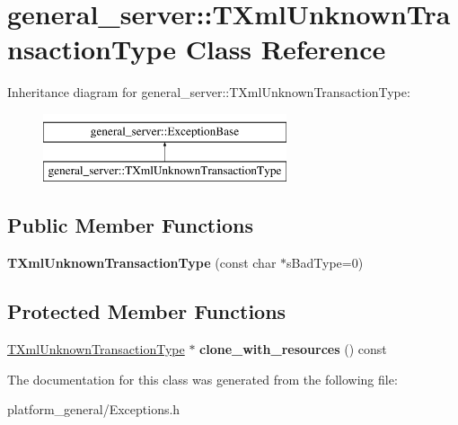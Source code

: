 \hypertarget{classgeneral__server_1_1TXmlUnknownTransactionType}{\section{general\-\_\-server\-:\-:\-T\-Xml\-Unknown\-Transaction\-Type \-Class \-Reference}
\label{classgeneral__server_1_1TXmlUnknownTransactionType}
}
\-Inheritance diagram for general\-\_\-server\-:\-:\-T\-Xml\-Unknown\-Transaction\-Type\-:\begin{figure}[H]
\begin{center}
\leavevmode
\includegraphics[height=2.000000cm]{classgeneral__server_1_1TXmlUnknownTransactionType}
\end{center}
\end{figure}
\subsection*{\-Public \-Member \-Functions}
\begin{DoxyCompactItemize}
\item 
\hypertarget{classgeneral__server_1_1TXmlUnknownTransactionType_aa725714e2ea10f4ae264928d775fbc92}{{\bfseries \-T\-Xml\-Unknown\-Transaction\-Type} (const char $\ast$s\-Bad\-Type=0)}\label{classgeneral__server_1_1TXmlUnknownTransactionType_aa725714e2ea10f4ae264928d775fbc92}

\end{DoxyCompactItemize}
\subsection*{\-Protected \-Member \-Functions}
\begin{DoxyCompactItemize}
\item 
\hypertarget{classgeneral__server_1_1TXmlUnknownTransactionType_ad0a379c672fdc70eaa5d060a7d58a48a}{\hyperlink{classgeneral__server_1_1TXmlUnknownTransactionType}{\-T\-Xml\-Unknown\-Transaction\-Type} $\ast$ {\bfseries clone\-\_\-with\-\_\-resources} () const }\label{classgeneral__server_1_1TXmlUnknownTransactionType_ad0a379c672fdc70eaa5d060a7d58a48a}

\end{DoxyCompactItemize}


\-The documentation for this class was generated from the following file\-:\begin{DoxyCompactItemize}
\item 
platform\-\_\-general/\-Exceptions.\-h\end{DoxyCompactItemize}
